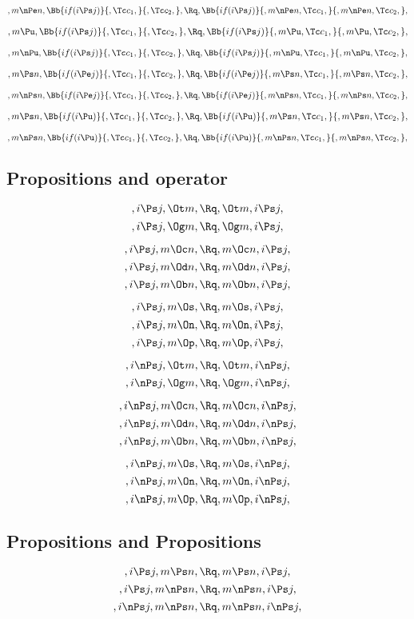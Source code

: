 \[,m \nPe n, \Bb{if(i \Ps j)}{,\Tc c_1,}{,\Tc c_2,}, \Rq , \Bb{if(i \Ps j)}{,m \nPe n,\Tc c_1,}{,m \nPe n,\Tc c_2,},\]
\bigskip
\bigskip

\[,m \Pu, \Bb{if(i \Ps j)}{,\Tc c_1,}{,\Tc c_2,}, \Rq , \Bb{if(i \Ps j)}{,m \Pu,\Tc c_1,}{,m \Pu,\Tc c_2,},\]
\bigskip
\bigskip

\[,m \nPu, \Bb{if(i \Ps j)}{,\Tc c_1,}{,\Tc c_2,}, \Rq , \Bb{if(i \Ps j)}{,m \nPu,\Tc c_1,}{,m \nPu,\Tc c_2,},\]
\bigskip
\bigskip


\[,m \Ps n, \Bb{if(i \Pe j)}{,\Tc c_1,}{,\Tc c_2,}, \Rq , \Bb{if(i \Pe j)}{,m \Ps n,\Tc c_1,}{,m \Ps n,\Tc c_2,},\]
\bigskip
\bigskip

\[,m \nPs n, \Bb{if(i \Pe j)}{,\Tc c_1,}{,\Tc c_2,}, \Rq , \Bb{if(i \Pe j)}{,m \nPs n,\Tc c_1,}{,m \nPs n,\Tc c_2,},\]
\bigskip
\bigskip

\[,m \Ps n, \Bb{if(i \Pu)}{,\Tc c_1,}{,\Tc c_2,}, \Rq , \Bb{if(i \Pu)}{,m \Ps n,\Tc c_1,}{,m \Ps n,\Tc c_2,},\]
\bigskip
\bigskip

\[,m \nPs n, \Bb{if(i \Pu)}{,\Tc c_1,}{,\Tc c_2,}, \Rq , \Bb{if(i \Pu)}{,m \nPs n,\Tc c_1,}{,m \nPs n,\Tc c_2,},\]
\bigskip
\bigskip


\bigskip
\bigskip
\bigskip
\bigskip
\subsection{ Propositions and operator}
\[, i \Ps j, \Ot m, \Rq , \Ot m, i \Ps j,\]
\[, i \Ps j, \Og m, \Rq , \Og m, i \Ps j,\]

\[, i \Ps j, m \Oc n, \Rq , m \Oc n, i \Ps j,\]
\[, i \Ps j, m \Od n, \Rq , m \Od n, i \Ps j,\]
\[, i \Ps j, m \Ob n, \Rq , m \Ob n, i \Ps j,\]

\[, i \Ps j, m \Os, \Rq , m \Os, i \Ps j,\]
\[, i \Ps j, m \On, \Rq , m \On, i \Ps j,\]
\[, i \Ps j, m \Op, \Rq , m \Op, i \Ps j,\]

\bigskip
\bigskip
\[, i \nPs j, \Ot m, \Rq , \Ot m, i \nPs j,\]
\[, i \nPs j, \Og m, \Rq , \Og m, i \nPs j,\]

\[, i \nPs j, m \Oc n, \Rq , m \Oc n, i \nPs j,\]
\[, i \nPs j, m \Od n, \Rq , m \Od n, i \nPs j,\]
\[, i \nPs j, m \Ob n, \Rq , m \Ob n, i \nPs j,\]

\[, i \nPs j, m \Os, \Rq , m \Os, i \nPs j,\]
\[, i \nPs j, m \On, \Rq , m \On, i \nPs j,\]
\[, i \nPs j, m \Op, \Rq , m \Op, i \nPs j,\]

\bigskip
\bigskip
\bigskip
\bigskip
\subsection{ Propositions and Propositions}
\[,i \Ps j, m \Ps n, \Rq , m \Ps n, i \Ps j,\]
\[,i \Ps j, m \nPs n, \Rq , m \nPs n, i \Ps j,\]
\[,i \nPs j, m \nPs n, \Rq , m \nPs n, i \nPs j,\]


